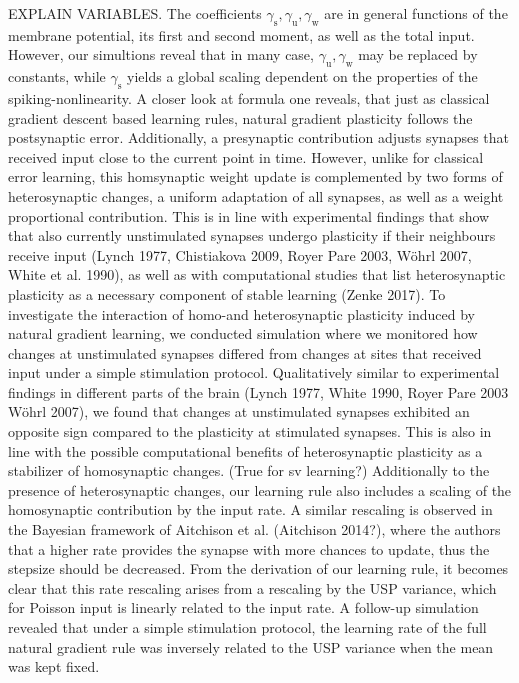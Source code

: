 \documentclass[12pt]{article}
\newcommand{\mrm}{\mathrm}
\begin{document}
EXPLAIN VARIABLES. 
The coefficients $\gamma_{\mrm s},\gamma_{\mrm u},\gamma_{\mrm w}$ are in general functions of the membrane potential, its first and second moment, as well as the total input. However, our simultions reveal that in many case, $\gamma_{\mrm u},\gamma_{\mrm w}$ may be replaced by constants, while $\gamma_{\mrm s}$ yields a global scaling dependent on the properties of the spiking-nonlinearity.
A closer look at formula one reveals, that just as classical gradient descent based learning rules, natural gradient plasticity follows the postsynaptic error. Additionally, a presynaptic contribution adjusts synapses that received input close to the current point in time. However, unlike for classical error learning, this homsynaptic weight update is complemented by two forms of heterosynaptic changes, a uniform adaptation of all synapses, as well as a weight proportional contribution. This is in line with experimental findings that show that also currently unstimulated synapses undergo plasticity if their neighbours receive input (Lynch 1977, Chistiakova 2009, Royer Pare 2003, Wöhrl 2007, White et al. 1990), as well as with computational studies that list heterosynaptic plasticity as a necessary component of stable learning (Zenke 2017). To investigate the interaction of homo-and heterosynaptic plasticity induced by natural gradient learning, we conducted simulation where we monitored how changes at unstimulated synapses differed from changes at sites that received input under a simple stimulation protocol. Qualitatively similar to experimental findings in different parts of the brain (Lynch 1977, White 1990, Royer Pare 2003 Wöhrl 2007), we found that changes at unstimulated synapses exhibited an opposite sign compared to the plasticity at stimulated synapses. This is also in line with the possible computational benefits of heterosynaptic plasticity as a stabilizer of homosynaptic changes. (True for sv learning?)
Additionally to the presence of heterosynaptic changes, our learning rule also includes a scaling of the homosynaptic contribution by the input rate. A similar rescaling is observed in the Bayesian framework of Aitchison et al. (Aitchison 2014?), where the authors that a higher rate provides the synapse with more chances to update, thus the stepsize should be decreased. From the derivation of our learning rule, it becomes clear that this rate rescaling arises from a rescaling by the USP variance, which for Poisson input is linearly related to the input rate. A follow-up simulation revealed that under a simple stimulation protocol, the learning rate of the full natural gradient rule was inversely related to the USP variance when the mean was kept fixed. 
\end{document}
